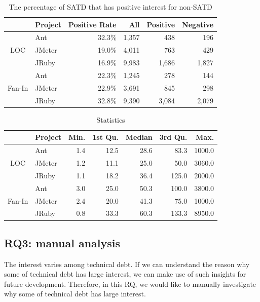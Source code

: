 \begin{table}[tb]
  \caption{The percentage of SATD that has positive interest for non-SATD}
  \label{tab:percentage_non-SATD}
  \centering

  \begin{tabular}{cl|r|rrr}
  \hline
      &  Project & Positive Rate & All & Positive & Negative \\
  \hline
        & Ant    & 32.3\% & 1,357 &  438  &   196 \\
   LOC  & JMeter & 19.0\% & 4,011 &  763  &   429 \\
        & JRuby  & 16.9\% & 9,983 & 1,686 & 1,827 \\
  \hline
        & Ant    & 22.3\% & 1,245 &   278  &   144 \\
Fan-In  & JMeter & 22.9\% & 3,691 &   845  &   298 \\
        & JRuby  & 32.8\% & 9,390 & 3,084  & 2,079 \\
  \hline
  \end{tabular}
\end{table}

\begin{table}[tb]
  \caption{Statistics}
  \label{tab:statistic_non-SATD}
  \centering

  \begin{tabular}{cl|rrrrr}
  \hline
      &  Project & Min. & 1st Qu. & Median & 3rd Qu. & Max. \\
  \hline
        & Ant    & 1.4 &  12.5 &  28.6  &   83.3 & 1000.0 \\
   LOC  & JMeter & 1.2 &  11.1 &  25.0  &   50.0 & 3060.0 \\
        & JRuby  & 1.1 &  18.2 &  36.4  &  125.0 & 2000.0 \\
  \hline
        & Ant    & 3.0 &  25.0 &  50.3  &  100.0 & 3800.0 \\
Fan-In  & JMeter & 2.4 &  20.0 &  41.3  &   75.0 & 1000.0 \\
        & JRuby  & 0.8 &  33.3 &  60.3  &  133.3 & 8950.0 \\
  \hline
  \end{tabular}
\end{table}

\subsection{RQ3: manual analysis}
The interest varies among technical debt. If we can understand the reason why some of technical debt has large interest, we can make use of such insights for future development. Therefore, in this RQ, we would like to manually investigate why some of technical debt has large interest.

